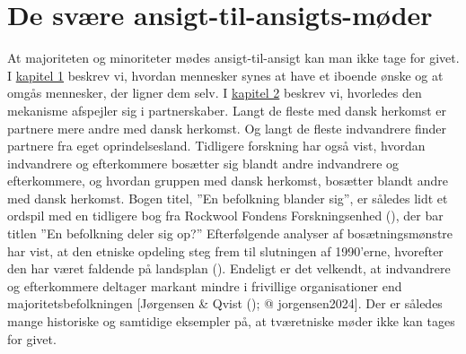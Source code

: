 \documentclass[
]{book}
\begin{document}
\section{De svære ansigt-til-ansigts-møder}\label{de-svuxe6re-ansigt-til-ansigts-muxf8der}

At majoriteten og minoriteter mødes ansigt-til-ansigt kan man ikke tage for givet. I \hyperref[kap1]{kapitel 1} beskrev vi, hvordan mennesker synes at have et iboende ønske og at omgås mennesker, der ligner dem selv. I \hyperref[kap2]{kapitel 2} beskrev vi, hvorledes den mekanisme afspejler sig i partnerskaber. Langt de fleste med dansk herkomst er partnere mere andre med dansk herkomst. Og langt de fleste indvandrere finder partnere fra eget oprindelsesland. Tidligere forskning har også vist, hvordan indvandrere og efterkommere bosætter sig blandt andre indvandrere og efterkommere, og hvordan gruppen med dansk herkomst, bosætter blandt andre med dansk herkomst. Bogen titel, ''En befolkning blander sig'', er således lidt et ordspil med en tidligere bog fra Rockwool Fondens Forskningsenhed (), der bar titlen ''En befolkning deler sig op?'' Efterfølgende analyser af bosætningsmønstre har vist, at den etniske opdeling steg frem til slutningen af 1990'erne, hvorefter den har været faldende på landsplan (). Endeligt er det velkendt, at indvandrere og efterkommere deltager markant mindre i frivillige organisationer end majoritetsbefolkningen {[}Jørgensen \& Qvist (); @ jorgensen2024{]}. Der er således mange historiske og samtidige eksempler på, at tværetniske møder ikke kan tages for givet.
\end{document}
